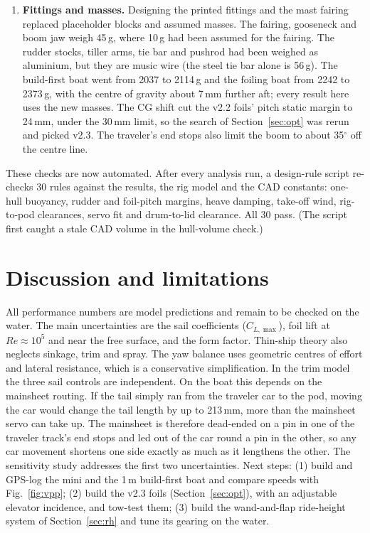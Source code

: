 \documentclass[10pt,twocolumn]{article}
\begin{document}
\begin{enumerate}
\item \textbf{Fittings and masses.} Designing the printed fittings and the mast fairing replaced placeholder blocks and assumed masses. The fairing, gooseneck and boom jaw weigh 45\,g, where 10\,g had been assumed for the fairing. The rudder stocks, tiller arms, tie bar and pushrod had been weighed as aluminium, but they are music wire (the steel tie bar alone is 56\,g). The build-first boat went from 2037 to 2114\,g and the foiling boat from 2242 to 2373\,g, with the centre of gravity about 7\,mm further aft; every result here uses the new masses. The CG shift cut the v2.2 foils' pitch static margin to 24\,mm, under the 30\,mm limit, so the search of Section~\ref{sec:opt} was rerun and picked v2.3. The traveler's end stops also limit the boom to about 35$^\circ$ off the centre line.
\end{enumerate}
These checks are now automated. After every analysis run, a design-rule script re-checks 30 rules against the results, the rig model and the CAD constants: one-hull buoyancy, rudder and foil-pitch margins, heave damping, take-off wind, rig-to-pod clearances, servo fit and drum-to-lid clearance. All 30 pass. (The script first caught a stale CAD volume in the hull-volume check.)

\section{Discussion and limitations}
All performance numbers are model predictions and remain to be checked on the water. The main uncertainties are the sail coefficients ($C_{L,\max}$), foil lift at $Re\approx10^5$ and near the free surface, and the form factor. Thin-ship theory also neglects sinkage, trim and spray. The yaw balance uses geometric centres of effort and lateral resistance, which is a conservative simplification. In the trim model the three sail controls are independent. On the boat this depends on the mainsheet routing. If the tail simply ran from the traveler car to the pod, moving the car would change the tail length by up to 213\,mm, more than the mainsheet servo can take up. The mainsheet is therefore dead-ended on a pin in one of the traveler track's end stops and led out of the car round a pin in the other, so any car movement shortens one side exactly as much as it lengthens the other. The sensitivity study addresses the first two uncertainties. Next steps: (1) build and GPS-log the mini and the 1\,m build-first boat and compare speeds with Fig.~\ref{fig:vpp}; (2) build the v2.3 foils (Section~\ref{sec:opt}), with an adjustable elevator incidence, and tow-test them; (3) build the wand-and-flap ride-height system of Section~\ref{sec:rh} and tune its gearing on the water.
\end{document}
